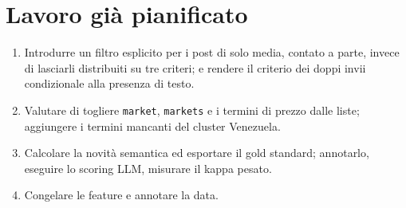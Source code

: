 \documentclass[11pt,a4paper]{article}
\begin{document}
\section{Lavoro già pianificato}

\begin{enumerate}
  \item Introdurre un filtro esplicito per i post di solo media, contato a
    parte, invece di lasciarli distribuiti su tre criteri; e rendere il
    criterio dei doppi invii condizionale alla presenza di testo.
  \item Valutare di togliere \texttt{market}, \texttt{markets} e i termini di prezzo dalle
    liste; aggiungere i termini mancanti del cluster Venezuela.
  \item Calcolare la novità semantica ed esportare il gold standard;
    annotarlo, eseguire lo scoring LLM, misurare il kappa pesato.
  \item Congelare le feature e annotare la data.
\end{enumerate}
\end{document}

